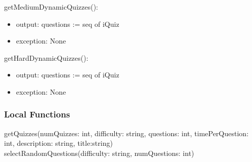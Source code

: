 \documentclass[12pt, titlepage]{article}
\begin{document}
\noindent getMediumDynamicQuizzes():
\begin{itemize}
\item output: questions := seq of iQuiz
\item exception: None
\end{itemize}

\noindent getHardDynamicQuizzes():
\begin{itemize}
\item output: questions := seq of iQuiz
\item exception: None
\end{itemize}

\subsubsection{Local Functions}
getQuizzes(numQuizzes: int, difficulty: string, questions: int, timePerQuestion: int, description: string, title:string)\\
selectRandomQuestions(difficulty: string, numQuestions: int)\\

\newpage


%
%
\end{document}

